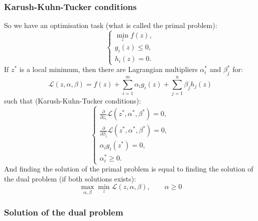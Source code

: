 \subsubsection*{Karush-Kuhn-Tucker conditions}

So we have an optimisation task (what is called the primal problem):
$$\begin{cases}
	\min\limits_{z}f(z), \\
	g_i(z)\le0, \\
	h_i(z)=0.
\end{cases}$$
If $z^*$ is a local minimum, then there are Lagrangian multipliers $\alpha_i^*$ and $\beta_j^*$ for:
$$\mathcal{L}(z,\alpha,\beta)=f(z)+\sum\limits_{i=1}^{m}\alpha_i g_i(z)+\sum\limits_{j=1}^{n}\beta_jh_j(z)$$
such that (Karush-Kuhn-Tucker conditions):
$$\begin{cases}
	\frac{\partial}{\partial z_i}\mathcal{L}(z^*,\alpha^*,\beta^*)=0, \\
	\frac{\partial}{\partial \beta_i}\mathcal{L}(z^*,\alpha^*,\beta^*)=0, \\
	\alpha_i g_i(z^*)=0, \\
	\alpha_i^*\ge0.
\end{cases}$$
And finding the solution of the primal problem is equal to finding the solution of the dual problem (if both solutions exists):
$$\max\limits_{\alpha,\beta}\min\limits_{z}\mathcal{L}(z,\alpha,\beta),\qquad\alpha\ge0$$

\subsubsection*{Solution of the dual problem}

